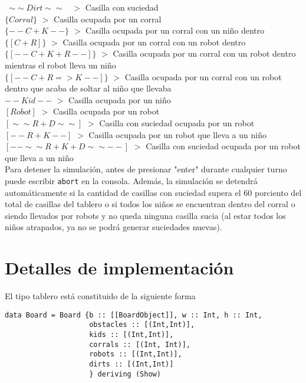 \documentclass[a4paper,12pt]{article}
\def\code#1{\texttt{#1}}
\begin{document}
\code{ $\sim\sim Dirt \sim\sim$ } $>$ Casilla con suciedad\\

\code{$\{Corral\}$} $>$ Casilla ocupada por un corral\\

\code{$\{--C+K--\}$} $>$ Casilla ocupada por un corral con un niño dentro\\

\code{$\{[C+R]\}$} $>$ Casilla ocupada por un corral con un robot dentro\\

\code{$\{[--C+K+R--]\}$} $>$ Casilla ocupada por un corral con un robot dentro mientras el robot lleva un niño\\

\code{$\{[--C+R=>K--]\}$} $>$ Casilla ocupada por un corral con un robot dentro que acaba de soltar al niño que llevaba\\

\code{$--Kid--$} $>$ Casilla ocupada por un niño\\

\code{$[Robot]$} $>$ Casilla ocupada por un robot\\

\code{$[\sim\sim R+D\sim\sim ]$} $>$ Casilla con suciedad ocupada por un robot\\

\code{$[--R+K--]$} $>$ Casilla ocupada por un robot que lleva a un niño\\

\code{$[--\sim\sim R+K+D \sim\sim -- ]$} $>$ Casilla con suciedad ocupada por un robot que lleva a un niño\\


Para detener la simulación, antes de presionar "enter" durante cualquier turno puede escribir \code{abort} en la consola. Además, la simulación se detendrá automáticamente si la cantidad de casillas con suciedad supera el 60 porciento del total de casillas del tablero o si todos los niños se encuentran dentro del corral o siendo llevados por robots y no queda ninguna casilla sucia (al estar todos los niños atrapados, ya no se podrá generar suciedades nuevas).


\section*{Detalles de implementación}
El tipo tablero está constituido de la siguiente forma 

\begin{lstlisting}
data Board = Board {b :: [[BoardObject]], w :: Int, h :: Int,
                    obstacles :: [(Int,Int)],
                    kids :: [(Int,Int)],
                    corrals :: [(Int, Int)],
                    robots :: [(Int,Int)],
                    dirts :: [(Int,Int)]
                    } deriving (Show)
\end{lstlisting}
\end{document}
